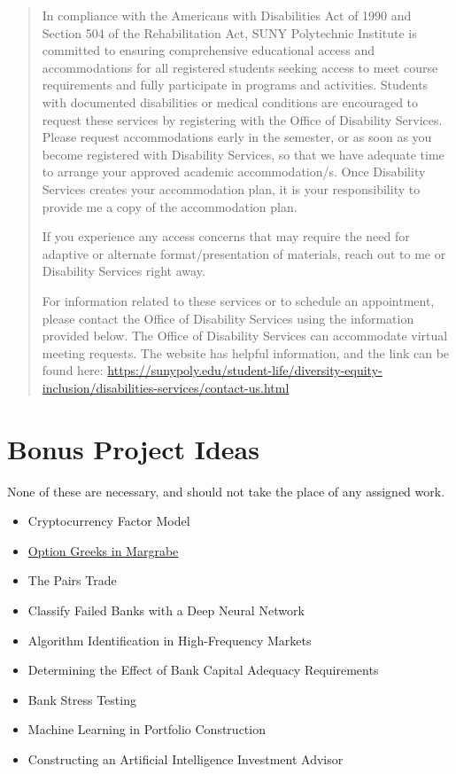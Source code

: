 \documentclass[11pt]{article}
\begin{document}
\begin{quote}
In compliance with the Americans with Disabilities Act of 1990 and Section 504 of the Rehabilitation Act, SUNY Polytechnic Institute is committed to ensuring comprehensive educational access and accommodations for all registered students seeking access to meet course requirements and fully participate in programs and activities.  Students with documented disabilities or medical conditions are encouraged to request these services by registering with the Office of Disability Services. Please request accommodations early in the semester, or as soon as you become registered with Disability Services, so that we have adequate time to arrange your approved academic accommodation/s.  Once Disability Services creates your accommodation plan, it is your responsibility to provide me a copy of the accommodation plan.

If you experience any access concerns that may require the need for adaptive or alternate format/presentation of materials, reach out to me or Disability Services right away. 

For information related to these services or to schedule an appointment, please contact the Office of Disability Services using the information provided below.  The Office of Disability Services can accommodate virtual meeting requests.  The website has helpful information, and the link can be found here: \url{https://sunypoly.edu/student-life/diversity-equity-inclusion/disabilities-services/contact-us.html}
\end{quote}
\section{Bonus Project Ideas}
\label{sec:orgcb48f43}

None of these are necessary, and should not take the place of any assigned work.

\begin{itemize}
\item Cryptocurrency Factor Model
\item \href{https://colab.research.google.com/drive/1OtpEsx3RyoishcmKX4Q0a\_DZ2XHM3rje?usp=sharing}{Option Greeks in Margrabe}
\item The Pairs Trade
\item Classify Failed Banks with a Deep Neural Network
\item Algorithm Identification in High-Frequency Markets
\item Determining the Effect of Bank Capital Adequacy Requirements
\item Bank Stress Testing
\item Machine Learning in Portfolio Construction
\item Constructing an Artificial Intelligence Investment Advisor
\end{itemize}
\end{document}
